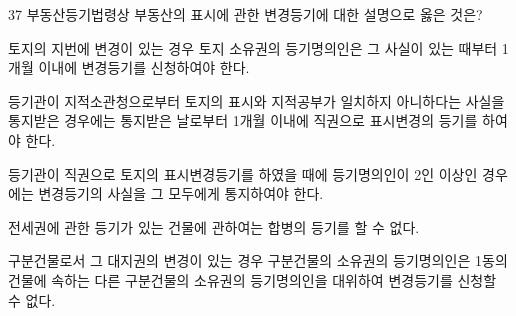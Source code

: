 \begin{question}{37}
부동산등기법령상 부동산의 표시에 관한 변경등기에 대한 설명으로 옳은 것은?
\begin{choices}
  \item 토지의 지번에 변경이 있는 경우 토지 소유권의 등기명의인은 그 사실이 있는 때부터 1개월 이내에 변경등기를 신청하여야 한다.
  \item 등기관이 지적소관청으로부터 토지의 표시와 지적공부가 일치하지 아니하다는 사실을 통지받은 경우에는 통지받은 날로부터 1개월 이내에 직권으로 표시변경의 등기를 하여야 한다.
  \item 등기관이 직권으로 토지의 표시변경등기를 하였을 때에 등기명의인이 2인 이상인 경우에는 변경등기의 사실을 그 모두에게 통지하여야 한다.
  \item 전세권에 관한 등기가 있는 건물에 관하여는 합병의 등기를 할 수 없다.
  \item 구분건물로서 그 대지권의 변경이 있는 경우 구분건물의 소유권의 등기명의인은 1동의 건물에 속하는 다른 구분건물의 소유권의 등기명의인을 대위하여 변경등기를 신청할 수 없다.
\end{choices}
\end{question}
